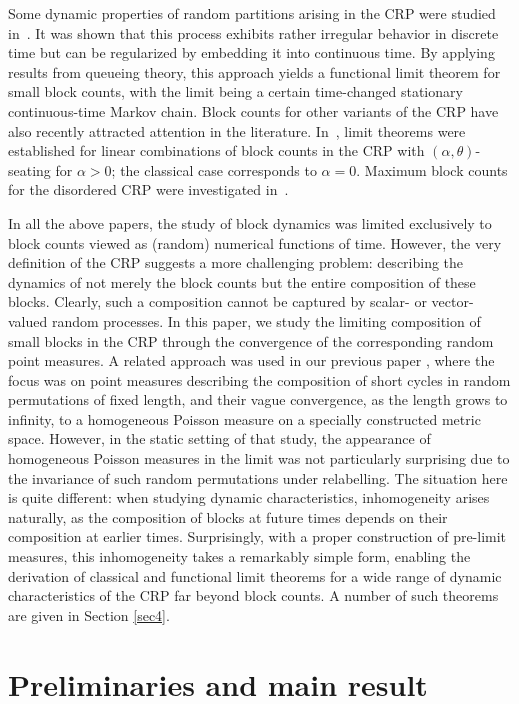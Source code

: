 \documentclass[11pt]{article}
\newcommand{\1}[1][]{
	\ifx&#1&\mathds{1}
	\else\mathds{1}\left\{#1\right\}\fi}
\theoremstyle{definition}
\theoremstyle{remark}
\numberwithin{equation}{section}
\begin{document}
	Some dynamic properties of random partitions arising in the CRP were studied in~\cite{GS23}. It was shown that this process exhibits rather irregular behavior in discrete time but can be regularized by embedding it into continuous time. By applying results from queueing theory, this approach yields a functional limit theorem for small block counts, with the limit being a certain time-changed stationary continuous-time Markov chain.
	Block counts for other variants of the CRP have also recently attracted attention in the literature. In~\cite{GW24}, limit theorems were established for linear combinations of block counts in the CRP with $(\alpha,\theta)$-seating for $\alpha>0$; the classical case corresponds to $\alpha=0$. Maximum block counts for the disordered CRP were investigated in~\cite{BMMU24}.
	
	In all the above papers, the study of block dynamics was limited exclusively to block counts viewed as (random) numerical functions of time. However, the very definition of the CRP suggests a more challenging problem: describing the dynamics of not merely the block counts but the entire composition of these blocks. Clearly, such a composition cannot be captured by scalar- or vector-valued random processes.
	In this paper, we study the limiting composition of small blocks in the CRP through the convergence of the corresponding random point measures. A related approach 
	was used in our previous paper \cite{GI24}, where the focus was on point measures describing the composition of short cycles in random permutations of fixed length, and 
	their vague convergence, as the length grows to infinity, to a homogeneous Poisson measure on a specially constructed metric space. However, in the static setting of 
	that study, the appearance of homogeneous Poisson measures in the limit was not particularly surprising due to the invariance of such random permutations under 
	relabelling. The situation here is quite different: when studying dynamic characteristics, inhomogeneity arises naturally, as the composition of blocks at future times 
	depends on their composition at earlier times. Surprisingly, with a proper construction of pre-limit measures, this inhomogeneity takes a remarkably simple form, 
	enabling the derivation of classical and functional limit theorems for a wide range of dynamic characteristics of the CRP far beyond block counts. A number of such theorems are given in Section \ref{sec4}.
	
	\section{Preliminaries and main result}\label{sec2}
	
\end{document}
